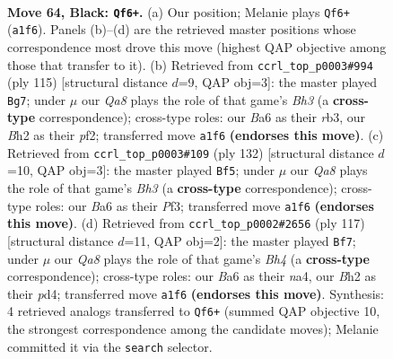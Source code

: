 \documentclass[11pt]{article}
\begin{document}
\clearpage

\begin{figure}[p]\centering
\begin{subfigure}{0.46\textwidth}\centering
\resizebox{\linewidth}{!}{%
\newchessgame
\chessboard[
  setfen={5K2/8/b5k1/6p1/8/8/7b/q7 b - - 1 64},
  showmover=false,
  pgfstyle=straightmove, color=movearrow, markmove={a1-f6}
]}
\caption{}
\end{subfigure}\hfill
\begin{subfigure}{0.46\textwidth}\centering
\resizebox{\linewidth}{!}{%
\newchessgame
\chessboard[
  setfen={8/8/4pk1b/8/6K1/1R6/5P2/8 b - - 16 58},
  showmover=false,
  pgfstyle=straightmove, color=movearrow, markmove={h6-g7}
]}
\caption{}
\end{subfigure}
\\[4pt]
\begin{subfigure}{0.46\textwidth}\centering
\resizebox{\linewidth}{!}{%
\newchessgame
\chessboard[
  setfen={8/4k2P/6K1/4b3/8/5P1B/8/8 w - - 17 67},
  showmover=false,
  pgfstyle=straightmove, color=movearrow, markmove={h3-f5}
]}
\caption{}
\end{subfigure}\hfill
\begin{subfigure}{0.46\textwidth}\centering
\resizebox{\linewidth}{!}{%
\newchessgame
\chessboard[
  setfen={8/8/4k3/3p3b/N2P1K2/8/8/8 b - - 1 59},
  showmover=false,
  pgfstyle=straightmove, color=movearrow, markmove={h5-f7}
]}
\caption{}
\end{subfigure}
\caption{\textbf{Move 64, Black: \texttt{Qf6+}.} (a) Our position; Melanie plays \texttt{Qf6+} (\texttt{a1f6}). Panels (b)--(d) are the retrieved master positions whose correspondence most drove this move (highest QAP objective among those that transfer to it). (b) Retrieved from \texttt{ccrl\_top\_p0003\#994} (ply 115) [structural distance $d$=9, QAP obj=3]: the master played \texttt{Bg7}; under $\mu$ our \emph{Qa8} plays the role of that game's \emph{Bh3} (a \textbf{cross-type} correspondence); cross-type roles: our \emph{B}a6 as their \emph{r}b3, our \emph{B}h2 as their \emph{p}f2; transferred move \texttt{a1f6} \textbf{(endorses this move)}. (c) Retrieved from \texttt{ccrl\_top\_p0003\#109} (ply 132) [structural distance $d$=10, QAP obj=3]: the master played \texttt{Bf5}; under $\mu$ our \emph{Qa8} plays the role of that game's \emph{Bh3} (a \textbf{cross-type} correspondence); cross-type roles: our \emph{B}a6 as their \emph{P}f3; transferred move \texttt{a1f6} \textbf{(endorses this move)}. (d) Retrieved from \texttt{ccrl\_top\_p0002\#2656} (ply 117) [structural distance $d$=11, QAP obj=2]: the master played \texttt{Bf7}; under $\mu$ our \emph{Qa8} plays the role of that game's \emph{Bh4} (a \textbf{cross-type} correspondence); cross-type roles: our \emph{B}a6 as their \emph{n}a4, our \emph{B}h2 as their \emph{p}d4; transferred move \texttt{a1f6} \textbf{(endorses this move)}. Synthesis: 4 retrieved analogs transferred to \texttt{Qf6+} (summed QAP objective 10, the strongest correspondence among the candidate moves); Melanie committed it via the \texttt{search} selector.}
\label{fig:thought-m127}
\end{figure}
\end{document}
